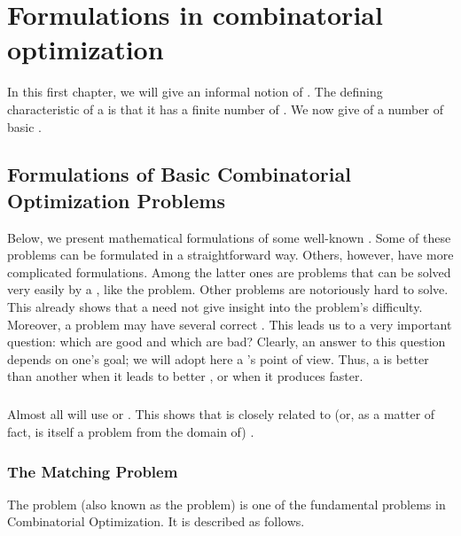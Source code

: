 \chapter{Formulations in combinatorial optimization}
In this first chapter, we will give an informal notion of . The defining characteristic of a  is that it has a finite number of . We now give  of a number of basic .

\section{Formulations of Basic Combinatorial Optimization Problems}
Below, we present mathematical formulations of some well-known . Some of these problems can be formulated in a straightforward way. Others, however, have more complicated formulations. Among the latter ones are problems that can be solved very easily by a , like the  problem. Other problems are notoriously hard to solve. This already shows that a  need not give insight into the problem's difficulty. Moreover, a problem may have several correct . This leads us to a very important question: which  are good and which are bad? Clearly, an answer to this question depends on one's goal; we will adopt here a 's point of view. Thus, a  is better than another  when it leads to better , or when it produces  faster.

\paragraph{}
Almost all  will use  or . This shows that  is closely related to (or, as a matter of fact, is itself a problem from the domain of) .

\subsection{The Matching Problem}
The  problem (also known as the  problem) is one of the fundamental problems in Combinatorial Optimization. It is described as follows.

